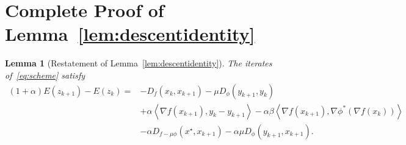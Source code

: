 \documentclass{article}
\newcommand{\dual}[1]{\left\langle {#1} \right\rangle}
\theoremstyle{plain}
\newtheorem{lemma}[theorem]{Lemma}
\theoremstyle{definition}
\theoremstyle{remark}
\begin{document}
\section{Complete Proof of Lemma~\ref{lem:descentidentity}}
\begin{lemma}[Restatement of Lemma~\ref{lem:descentidentity}]
The iterates of~\eqref{eq:scheme} satisfy
\begin{equation}
\begin{split}
(1+\alpha)E(z_{k+1})-E(z_k)
={}&-D_f(x_k,x_{k+1})-\mu D_\phi(y_{k+1},y_k)\\
&+\alpha\dual{\nabla f(x_{k+1}),y_k-y_{k+1}}
-\alpha\beta\dual{\nabla f(x_{k+1}),\nabla\phi^*(\nabla f(x_k))}\\
&-\alpha D_{f-\mu\phi}(x^\star,x_{k+1})
-\alpha\mu D_\phi(y_{k+1},x_{k+1}).
\end{split}
\end{equation}
\end{lemma}
%
\end{document}
